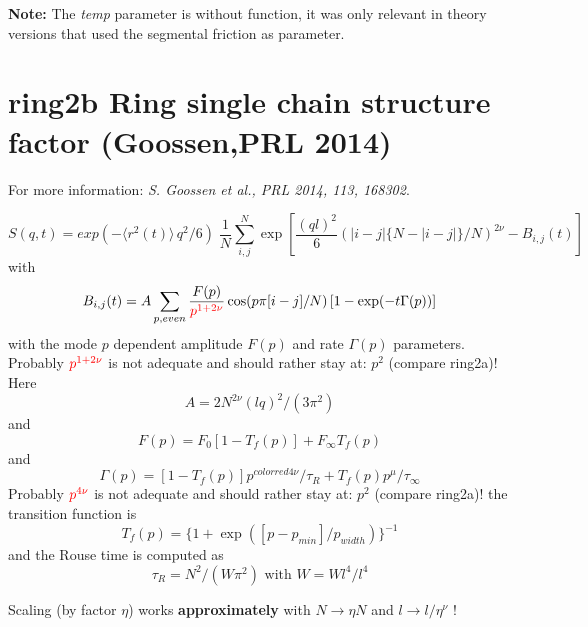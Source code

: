 \documentclass[11pt,fleqn]{book} %
\newcommand{\linespace}{\vspace{4ex}}
\newcommand{\desc}[1]{\hskip 0.5cm {\color{descgray} #1}}
\begin{document}
\linespace
{\bf Note:} The \emph{temp} parameter is without function, it was only relevant in 
theory versions that used the segmental friction as parameter. 



\chapter{ring2b \desc{Ring single chain structure factor (Goossen,PRL 2014) }}

\linespace
For more information: {\it S. Goossen et al., PRL 2014, 113, 168302}.
\linespace

\begin{exercise}
\begin{equation}
\label{eq:ring}
S(q,t) = exp\left (-\langle r^2(t) \rangle \, q^2/6 \right) \;
 \frac{1}{N} \sum_{i,j}^N \exp \left [ 
\frac{(ql)^2}{6} \left ( |i-j| \{ N-|i-j|\}/N \right )^{2 \nu}
- B_{i,j}(t)
\right ]
\end{equation}
with
\begin{equation}
B_{i,j}(t) = A\sum_{p,even} \frac{F(p)}{\color{red}p^{1+2\nu}} \cos(p \pi [i-j]/N) \, [1-\exp(-t \Gamma(p))]
\end{equation}
with the mode ${p}$ dependent amplitude ${F(p)}$ and rate ${\Gamma (p)}$ parameters.
Probably ${\color{red}p^{1+2\nu}}$ is not adequate and should rather stay at: ${p^2}$ (compare ring2a)!
Here
\begin{equation}
A = 2 N^{2\nu}(l q)^2/(3 \pi^2)
\end{equation}
and
\begin{equation}
F(p)=F_0 [1-T_f(p)] + F_\infty T_f(p)
\end{equation}
and
\begin{equation}
\Gamma(p) = [1-T_f(p)] p^{color{red}4 \nu}/\tau_R + T_f(p)p^{\mu}/\tau_\infty
\end{equation}
Probably ${\color{red}p^{4\nu}}$ is not adequate and should rather stay at: ${p^2}$ (compare ring2a)!
the transition function is
\begin{equation}
T_f(p) = \{1+\exp([p-p_{min}]/p_{width})\}^{-1}
\end{equation}
and the
Rouse time is computed as 
\begin{equation}
\tau_R = N^2/(W \pi^2) \text{   with   } W = Wl^4 / l^4
\end{equation}

Scaling (by factor ${\eta}$) works 
{\bf approximately} with ${N \rightarrow \eta N}$  and ${l \rightarrow l/\eta^\nu}$  !

\end{exercise}
\end{document}

